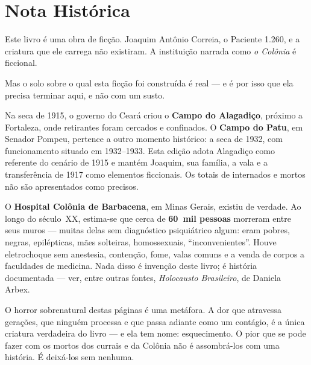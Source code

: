 \cleardoublepage
\chapter*{Nota Histórica}
\label{nota-historica}

\thispagestyle{empty}

\noindent Este livro é uma obra de ficção. Joaquim Antônio Correia, o
Paciente 1.260, e a criatura que ele carrega não existiram. A instituição
narrada como \textit{o Colônia} é ficcional.

\vspace{0.8em}

\noindent Mas o solo sobre o qual esta ficção foi construída é real --- e é
por isso que ela precisa terminar aqui, e não com um susto.

\vspace{0.8em}

\noindent Na seca de 1915, o governo do Ceará criou o \textbf{Campo do
Alagadiço}, próximo a Fortaleza, onde retirantes foram cercados e
confinados. O \textbf{Campo do Patu}, em Senador Pompeu, pertence a outro
momento histórico: a seca de 1932, com funcionamento situado em
1932--1933. Esta edição adota Alagadiço como referente do cenário de 1915 e
mantém Joaquim, sua família, a vala e a transferência de 1917 como elementos
ficcionais. Os totais de internados e mortos não são apresentados como
precisos.

\vspace{0.8em}

\noindent O \textbf{Hospital Colônia de Barbacena}, em Minas Gerais,
existiu de verdade. Ao longo do século~XX, estima-se que cerca de
\textbf{60~mil pessoas} morreram entre seus muros --- muitas delas sem
diagnóstico psiquiátrico algum: eram pobres, negras, epilépticas, mães
solteiras, homossexuais, ``inconvenientes''. Houve eletrochoque sem
anestesia, contenção, fome, valas comuns e a venda de corpos a faculdades
de medicina. Nada disso é invenção deste livro; é história documentada ---
ver, entre outras fontes, \textit{Holocausto Brasileiro}, de Daniela Arbex.

\vspace{0.8em}

\noindent O horror sobrenatural destas páginas é uma metáfora. A dor que
atravessa gerações, que ninguém processa e que passa adiante como um
contágio, é a única criatura verdadeira do livro --- e ela tem nome:
esquecimento. O pior que se pode fazer com os mortos dos currais e da
Colônia não é assombrá-los com uma história. É deixá-los sem nenhuma.

